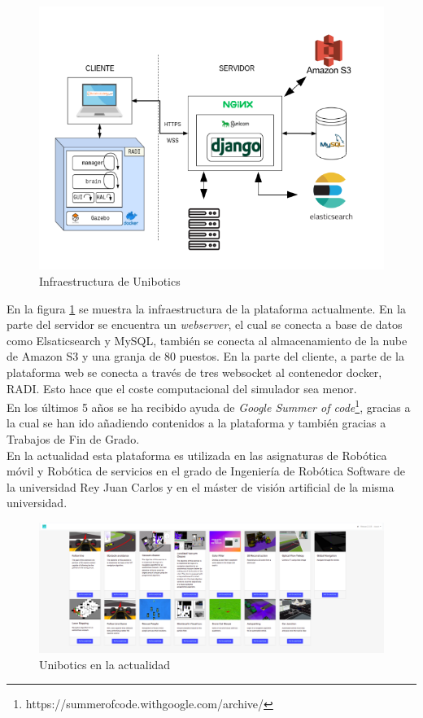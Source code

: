 \begin{figure}[H]
    \centering
    \includegraphics[width=13cm, keepaspectratio]{img/infraestructura.png}
    \caption{Infraestructura de Unibotics}
    \label{fig:infra}
\end{figure}
En la figura \ref{fig:infra} se muestra la infraestructura de la plataforma actualmente. En la parte del servidor se encuentra un \textit{webserver}, el cual se conecta a base de datos como Elsaticsearch y MySQL, también se conecta al almacenamiento de la nube de Amazon S3 y una granja de 80 puestos. En la parte del cliente, a parte de la plataforma web se conecta a través de tres websocket al contenedor docker, RADI. Esto hace que el coste computacional del simulador sea menor.\\

En los últimos 5 años se ha recibido ayuda de \textit{Google Summer of code}\footnote{https://summerofcode.withgoogle.com/archive/}, gracias a la cual se han ido añadiendo contenidos a la plataforma y también gracias a Trabajos de Fin de Grado.\\

En la actualidad esta plataforma es utilizada en las asignaturas de Robótica móvil y Robótica de servicios en el grado de Ingeniería de Robótica Software  de la universidad Rey Juan Carlos y en el máster de visión artificial de la misma universidad.

\begin{figure}[H]
    \centering
    \includegraphics[width=15cm, keepaspectratio]{img/unibotics.png}
    \caption{Unibotics en la actualidad}
    \label{fig:unibotics}
\end{figure}


